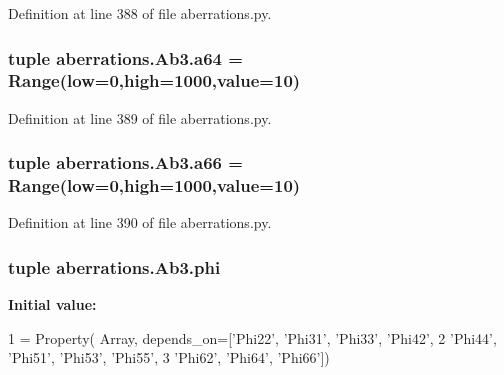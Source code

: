 Definition at line 388 of file aberrations.\-py.

\hypertarget{classaberrations_1_1_ab3_a5aae37e8015c07b5024cb56940daa2d4}{
\subsubsection[{a64}]{\setlength{\rightskip}{0pt plus 5cm}tuple aberrations.\-Ab3.\-a64 = Range(low=0,high=1000,{\bf value}=10)\hspace{0.3cm}{\ttfamily [static]}}}\label{classaberrations_1_1_ab3_a5aae37e8015c07b5024cb56940daa2d4}


Definition at line 389 of file aberrations.\-py.

\hypertarget{classaberrations_1_1_ab3_a0330fb84dbb9b210ef61b1706f87c255}{
\subsubsection[{a66}]{\setlength{\rightskip}{0pt plus 5cm}tuple aberrations.\-Ab3.\-a66 = Range(low=0,high=1000,{\bf value}=10)\hspace{0.3cm}{\ttfamily [static]}}}\label{classaberrations_1_1_ab3_a0330fb84dbb9b210ef61b1706f87c255}


Definition at line 390 of file aberrations.\-py.

\hypertarget{classaberrations_1_1_ab3_afd6e5e64c14cfe35b8128a781f58f767}{
\subsubsection[{phi}]{\setlength{\rightskip}{0pt plus 5cm}tuple aberrations.\-Ab3.\-phi\hspace{0.3cm}{\ttfamily [static]}}}\label{classaberrations_1_1_ab3_afd6e5e64c14cfe35b8128a781f58f767}
{\bfseries Initial value\-:}
\begin{DoxyCode}
1 = Property( Array, depends\_on=[\textcolor{stringliteral}{'Phi22'}, \textcolor{stringliteral}{'Phi31'}, \textcolor{stringliteral}{'Phi33'}, \textcolor{stringliteral}{'Phi42'},
2                                        \textcolor{stringliteral}{'Phi44'}, \textcolor{stringliteral}{'Phi51'}, \textcolor{stringliteral}{'Phi53'}, \textcolor{stringliteral}{'Phi55'},
3                                        \textcolor{stringliteral}{'Phi62'}, \textcolor{stringliteral}{'Phi64'}, \textcolor{stringliteral}{'Phi66'}])
\end{DoxyCode}


